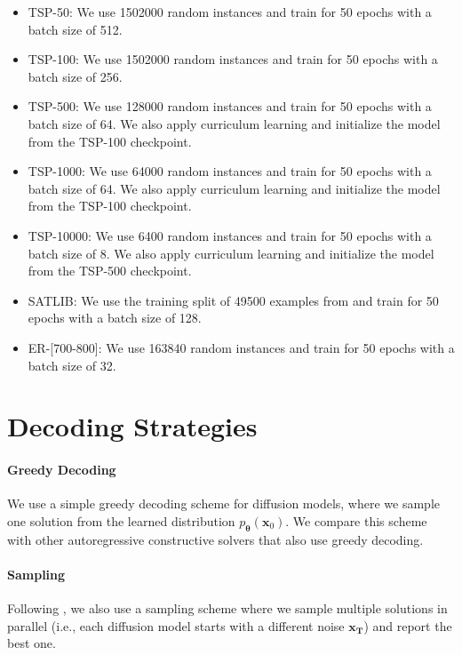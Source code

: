 \begin{itemize}[leftmargin=0.15in] \item TSP-50: We use 1502000 random instances and train \method{} for 50 epochs with a batch size of 512. \item TSP-100: We use 1502000 random instances and train \method{} for 50 epochs with a batch size of 256. \item TSP-500: We use 128000 random instances and train \method{} for 50 epochs with a batch size of 64. We also apply curriculum learning and initialize the model from the TSP-100 checkpoint. \item TSP-1000: We use 64000 random instances and train \method{} for 50 epochs with a batch size of 64. We also apply curriculum learning and initialize the model from the TSP-100 checkpoint. \item TSP-10000: We use 6400 random instances and train \method{} for 50 epochs with a batch size of 8. We also apply curriculum learning and initialize the model from the TSP-500 checkpoint. \item SATLIB: We use the training split of 49500 examples from \citep{hoos2000satlib,qiudimes} and train \method{} for 50 epochs with a batch size of 128. \item ER-[700-800]: We use 163840 random instances and train \method{} for 50 epochs with a batch size of 32. \end{itemize}


\section{Decoding Strategies} \label{app:decoding}

\paragraph{Greedy Decoding} We use a simple greedy decoding scheme for diffusion models, where we sample one solution from the learned distribution $p_{\boldsymbol{\theta}}(\mathbf{x}_0)$. We compare this scheme with other autoregressive constructive solvers that also use greedy decoding.

\paragraph{Sampling} Following \citet{19iclr-am}, we also use a sampling scheme where we sample multiple solutions in parallel (i.e., each diffusion model starts with a different noise $\mathbf{x_{T}}$) and report the best one.

